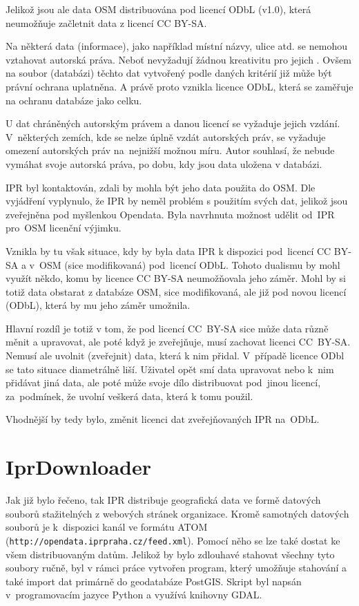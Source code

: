 Jelikož jsou ale data OSM distribuována pod licencí ODbL (v1.0), která
neumožňuje začletnit data z licencí CC BY-SA. 

Na některá data (informace), jako například místní názvy, ulice atd.
se nemohou vztahovat autorská práva. Neboť nevyžadují žádnou 
kreativitu pro jejich . Ovšem na soubor (databázi) těchto dat
vytvořený podle daných kritérií již může být právní
ochrana uplatněna. A právě proto vznikla licence ODbL, která se
zaměřuje na ochranu databáze jako celku.

U dat chráněných autorským právem a danou licencí se vyžaduje jejich
vzdání. V~některých zemích, kde se nelze úplně vzdát autorských
práv, se vyžaduje omezení autorských práv na~nejnižší možnou
míru. Autor souhlasí, že nebude vymáhat svoje autorská práva, po dobu,
kdy jsou data uložena v databázi. \cite{ODbl}

IPR byl kontaktován, zdali by mohla být jeho data použita do OSM.
Dle vyjádření vyplynulo, že IPR by neměl problém s použitím svých dat,
jelikož jsou zveřejněna pod myšlenkou Opendata. Byla navrhnuta
možnost udělit od~IPR pro~OSM licenční výjimku.

Vznikla by tu však situace, kdy by byla data IPR k dispozici 
pod~licencí CC BY-SA a v~OSM (sice modifikovaná) pod~licencí
ODbL. Tohoto dualismu by mohl využít někdo, komu by licence CC BY-SA
neumožňovala jeho záměr. Mohl by si totiž data obstarat z databáze OSM,
sice modifikovaná, ale již pod novou licencí (ODbL), která by mu jeho
záměr umožnila.

Hlavní rozdíl je totiž v tom, že pod licencí CC~BY-SA sice může data
různě měnit a upravovat, ale poté když je zveřejňuje, musí zachovat
licenci CC~BY-SA. Nemusí ale uvolnit (zveřejnit) data, která k nim 
přidal. V~případě licence ODbl se tato situace diametrálně liší.
Uživatel opět smí data upravovat nebo k~nim přidávat jiná data, ale
poté může svoje dílo distribuovat pod~jinou licencí, za~podmínek, že
uvolní veškerá data, která k tomu použil.

Vhodnější by tedy bylo, změnit licenci dat zveřejňovaných IPR
na~ODbL.



\section{IprDownloader}
\label{IprDownloader}
Jak již bylo řečeno, tak IPR distribuje geografická data ve formě datových souborů stažitelných z webových stránek organizace.
Kromě samotných datových souborů je k~dispozici kanál ve formátu ATOM ({\tt http://opendata.iprpraha.cz/feed.xml}).
Pomocí něho se lze také dostat ke všem distribuovaným datům. Jelikož
by bylo zdlouhavé stahovat všechny tyto soubory ručně, byl
v rámci práce vytvořen program, který umožňuje stahování a také import dat primárně do geodatabáze PostGIS. Skript byl
napsán v~programovacím jazyce Python a využívá knihovny GDAL.

